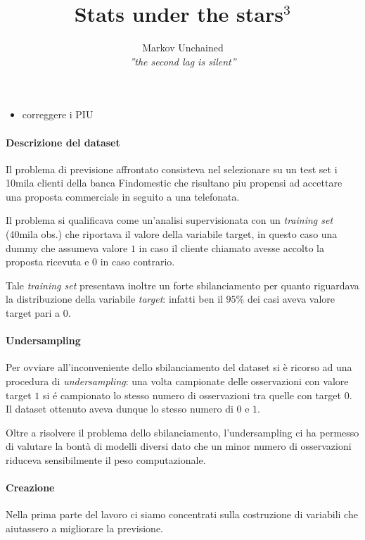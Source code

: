 \documentclass[]{scrreprt}
\title{Stats under the stars$^3$}
\author{Markov Unchained \\ \small \textit{''the second lag is silent''}}
\begin{document}
\maketitle

\begin{itemize}
	\item correggere i PIU
\end{itemize}

\paragraph{Descrizione del dataset}
Il problema di previsione affrontato consisteva nel selezionare su un test set i 10mila clienti della banca Findomestic che risultano piu propensi ad accettare una proposta commerciale in seguito a una telefonata. 

Il problema si qualificava come un'analisi supervisionata con un \textit{training set} (40mila obs.) che riportava il valore della variabile target, in questo caso una dummy che assumeva valore $1$ in caso il cliente chiamato avesse accolto la proposta ricevuta e $0$ in caso contrario. 

Tale \textit{training set} presentava inoltre un forte sbilanciamento per quanto riguardava la distribuzione della variabile \textit{target}: infatti ben il $95\%$ dei casi aveva valore target pari a $0$.

\paragraph{Undersampling}

Per ovviare all'inconveniente dello sbilanciamento del dataset si \`e ricorso ad una procedura di \textit{undersampling}: una volta campionate delle osservazioni con valore target $1$ si é campionato lo stesso numero di osservazioni tra quelle con target $0$. Il dataset ottenuto aveva dunque lo stesso numero di $0$ e $1$.

Oltre a risolvere il problema dello sbilanciamento, l'undersampling ci ha permesso di valutare la bont\`a di modelli diversi dato che un minor numero di osservazioni riduceva sensibilmente il peso computazionale.

\paragraph{Creazione } Nella prima parte del lavoro ci siamo concentrati sulla costruzione di variabili che aiutassero a migliorare la previsione.
\end{document}
